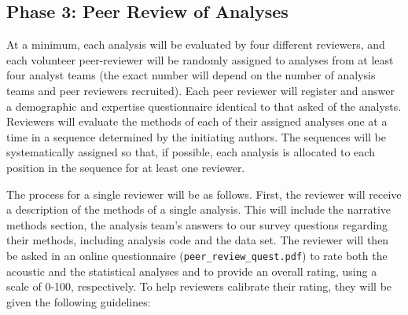\documentclass[
  12pt,
]{article}
\begin{document}
\hypertarget{phase-3-peer-review-of-analyses}{%
\subsection{Phase 3: Peer Review of Analyses}\label{phase-3-peer-review-of-analyses}}

At a minimum, each analysis will be evaluated by four different reviewers, and each volunteer peer-reviewer will be randomly assigned to analyses from at least four analyst teams (the exact number will depend on the number of analysis teams and peer reviewers recruited).
Each peer reviewer will register and answer a demographic and expertise questionnaire identical to that asked of the analysts.
Reviewers will evaluate the methods of each of their assigned analyses one at a time in a sequence determined by the initiating authors.
The sequences will be systematically assigned so that, if possible, each analysis is allocated to each position in the sequence for at least one reviewer.

The process for a single reviewer will be as follows.
First, the reviewer will receive a description of the methods of a single analysis.
This will include the narrative methods section, the analysis team's answers to our survey questions regarding their methods, including analysis code and the data set.
The reviewer will then be asked in an online questionnaire (\texttt{peer\_review\_quest.pdf}) to rate both the acoustic and the statistical analyses and to provide an overall rating, using a scale of 0-100, respectively.
To help reviewers calibrate their rating, they will be given the following guidelines:
\end{document}
